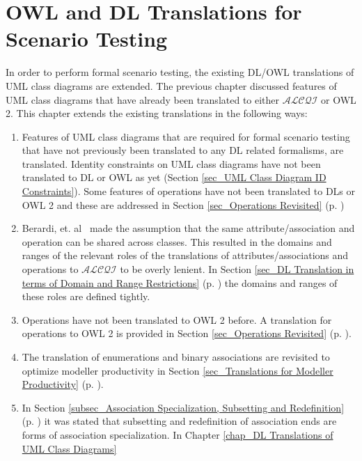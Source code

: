 \chapter{OWL and DL Translations for Scenario Testing}\label{chap_Translating UML Class Diagrams for Scenario Testing}
In order to perform formal scenario testing, the existing DL/OWL translations of UML class diagrams are extended.
The previous chapter discussed features of UML class diagrams that have already been translated to either $\mathcal{ALCQI}$ or OWL 2. This chapter extends the existing translations
in the following ways:
\begin{enumerate}
 \item Features of UML class diagrams that are required for formal scenario testing that have not previously been translated to any DL related formalisms, are translated.
 Identity constraints on UML class diagrams have not been translated to DL or OWL as yet (Section \ref{sec_UML Class Diagram ID Constraints}). 
 Some features of operations have not been translated to DLs or OWL 2 and these are addressed in Section \ref{sec_Operations Revisited} (p. \pageref{sec_Operations Revisited})
\item Berardi, et. al~\cite{Berardi2005} made the assumption that the same attribute/association 
and operation can be shared across classes. This resulted in the domains and ranges of the 
relevant roles of the translations of attributes/associations
and operations to $\mathcal{ALCQI}$ to be overly lenient.
In Section \ref{sec_DL Translation in terms of Domain and Range Restrictions} 
 (p. \pageref{sec_DL Translation in terms of Domain and Range Restrictions}) the domains and ranges of these roles
 are defined tightly.
 \item Operations have not been translated to OWL 2 before. A translation for operations to OWL 2 is provided in Section \ref{sec_Operations Revisited} (p. \pageref{sec_Operations Revisited}).
 \item The translation of enumerations and binary associations are revisited to optimize modeller productivity in Section 
 \ref{sec_Translations for Modeller Productivity} (p. \pageref{sec_Translations for Modeller Productivity}). 
 \item In Section \ref{subsec_Association Specialization, Subsetting and Redefinition} (p. \pageref{subsec_Association Specialization, Subsetting and Redefinition}) 
 it was stated that subsetting and redefinition of association ends are forms of association specialization. In Chapter \ref{chap_DL Translations of UML Class Diagrams}

\end{enumerate}
